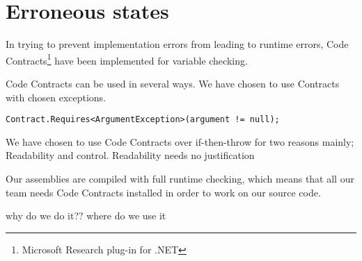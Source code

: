 \documentclass[../report.tex]{subfiles}
\begin{document}
\section{Erroneous states}

In trying to prevent implementation errors from leading to runtime errors, Code Contracts\footnote{Microsoft Research plug-in for .NET} have been implemented for variable checking.

Code Contracts can be used in several ways. We have chosen to use Contracts with chosen exceptions.

 \texttt{Contract.Requires<ArgumentException>(argument != null);}
 
We have chosen to use Code Contracts over if-then-throw for two reasons mainly; Readability and control. Readability needs no justification

Our assemblies are compiled with full runtime checking, which means that all our team needs Code Contracts installed in order to work on our source code.

why do we do it??
where do we use it
\end{document}
